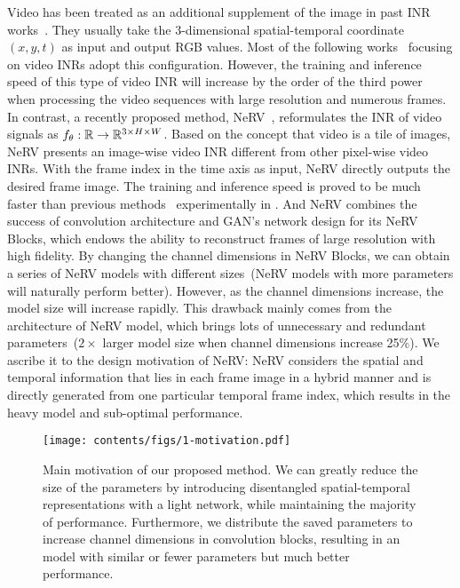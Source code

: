 \documentclass[runningheads]{llncs}
\begin{document}
Video has been treated as an additional supplement of the image in past INR works~\cite{sitzmann2020implicit,mehta2021modulated}. They usually take the $3$-dimensional spatial-temporal coordinate $(x,y,t)$ as input and output RGB values. Most of the following works~\cite{rho2022neural,zhang2021implicit} focusing on video INRs adopt this configuration. However, the training and inference speed of this type of video INR will increase by the order of the third power when processing the video sequences with large resolution and numerous frames. In contrast, a recently proposed method, NeRV~\cite{chen2021nerv}, reformulates the INR of video signals as $f_\theta: \mathbb{R}\rightarrow\mathbb{R}^{3\times H\times W}$. Based on the concept that video is a tile of images, NeRV presents an image-wise video INR different from other pixel-wise video INRs. With the frame index in the time axis as input, NeRV directly outputs the desired frame image. The training and inference speed is proved to be much faster than previous methods~\cite{sitzmann2020implicit,tancik2020fourier} experimentally in \cite{chen2021nerv}. And NeRV combines the success of convolution architecture and GAN's network design for its NeRV Blocks, which endows the ability to reconstruct frames of large resolution with high fidelity. By changing the channel dimensions in NeRV Blocks, we can obtain a series of NeRV models with different sizes~(NeRV models with more parameters will naturally perform better). However, as the channel dimensions increase, the model size will increase rapidly. This drawback mainly comes from the architecture of NeRV model, which brings lots of unnecessary and redundant parameters~($2\times$ larger model size when channel dimensions increase 25\%). We ascribe it to the design motivation of NeRV: NeRV considers the spatial and temporal information that lies in each frame image in a hybrid manner and is directly generated from one particular temporal frame index, which results in the heavy model and sub-optimal performance.

\begin{figure}[t]
    \centering
    \texttt{[image: contents/figs/1-motivation.pdf]}
    \caption{Main motivation of our proposed method. We can greatly reduce the size of the parameters by introducing disentangled spatial-temporal representations with a light network, while maintaining the majority of performance. Furthermore, we distribute the saved parameters to increase channel dimensions in convolution blocks, resulting in an \netname model with similar or fewer parameters but much better performance.}
    \label{fig:motivation}
\end{figure}
\end{document}
